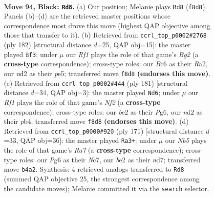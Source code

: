 \documentclass[11pt]{article}
\begin{document}
\clearpage

\begin{figure}[p]\centering
\begin{subfigure}{0.46\textwidth}\centering
\resizebox{\linewidth}{!}{%
\newchessgame
\chessboard[
  setfen={5r2/4kp2/2b3p1/4P3/1n3Ppp/8/3NBK1P/8 b - - 3 94},
  showmover=false,
  pgfstyle=straightmove, color=movearrow, markmove={f8-d8}
]}
\caption{}
\end{subfigure}\hfill
\begin{subfigure}{0.46\textwidth}\centering
\resizebox{\linewidth}{!}{%
\newchessgame
\chessboard[
  setfen={8/5r2/3p4/3Pp2p/4P2P/2kb2K1/R5B1/8 w - - 81 92},
  showmover=false,
  pgfstyle=straightmove, color=movearrow, markmove={g2-f3}
]}
\caption{}
\end{subfigure}
\\[4pt]
\begin{subfigure}{0.46\textwidth}\centering
\resizebox{\linewidth}{!}{%
\newchessgame
\chessboard[
  setfen={8/3bkn2/6p1/3K1p1p/1P2p2P/4P1P1/2R5/8 b - - 13 91},
  showmover=false,
  pgfstyle=straightmove, color=movearrow, markmove={f7-d6}
]}
\caption{}
\end{subfigure}\hfill
\begin{subfigure}{0.46\textwidth}\centering
\resizebox{\linewidth}{!}{%
\newchessgame
\chessboard[
  setfen={8/2nN2k1/2B2pp1/7p/3B3P/3K2P1/r7/8 b - - 39 86},
  showmover=false,
  pgfstyle=straightmove, color=movearrow, markmove={a2-a3}
]}
\caption{}
\end{subfigure}
\caption{\textbf{Move 94, Black: \texttt{Rd8}.} (a) Our position; Melanie plays \texttt{Rd8} (\texttt{f8d8}). Panels (b)--(d) are the retrieved master positions whose correspondence most drove this move (highest QAP objective among those that transfer to it). (b) Retrieved from \texttt{ccrl\_top\_p0002\#2768} (ply 182) [structural distance $d$=25, QAP obj=15]: the master played \texttt{Bf3}; under $\mu$ our \emph{Rf1} plays the role of that game's \emph{Bg2} (a \textbf{cross-type} correspondence); cross-type roles: our \emph{B}c6 as their \emph{R}a2, our \emph{n}d2 as their \emph{p}e5; transferred move \texttt{f8d8} \textbf{(endorses this move)}. (c) Retrieved from \texttt{ccrl\_top\_p0002\#444} (ply 181) [structural distance $d$=34, QAP obj=3]: the master played \texttt{Nd6}; under $\mu$ our \emph{Rf1} plays the role of that game's \emph{Nf2} (a \textbf{cross-type} correspondence); cross-type roles: our \emph{b}e2 as their \emph{P}g6, our \emph{n}d2 as their \emph{p}b4; transferred move \texttt{f8d8} \textbf{(endorses this move)}. (d) Retrieved from \texttt{ccrl\_top\_p0000\#920} (ply 171) [structural distance $d$=33, QAP obj=36]: the master played \texttt{Ra3+}; under $\mu$ our \emph{Nb5} plays the role of that game's \emph{Ra7} (a \textbf{cross-type} correspondence); cross-type roles: our \emph{P}g6 as their \emph{N}c7, our \emph{b}e2 as their \emph{n}d7; transferred move \texttt{b4a2}. Synthesis: 4 retrieved analogs transferred to \texttt{Rd8} (summed QAP objective 25, the strongest correspondence among the candidate moves); Melanie committed it via the \texttt{search} selector.}
\label{fig:thought-m187}
\end{figure}
\end{document}
